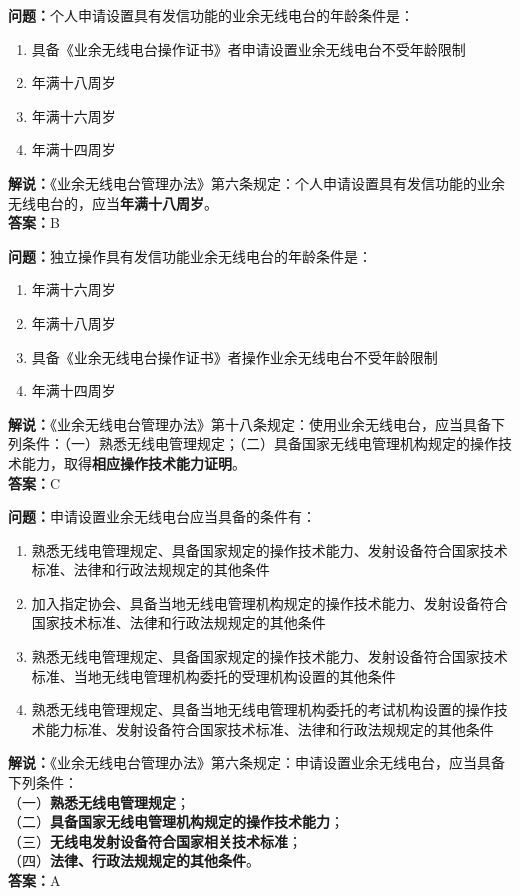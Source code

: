 \bigskip


\noindent\textbf{问题：}个人申请设置具有发信功能的业余无线电台的年龄条件是：
\begin{enumerate}[label=\Alph*), leftmargin=3em]
	\item 具备《业余无线电台操作证书》者申请设置业余无线电台不受年龄限制
	\item 年满十八周岁
	\item 年满十六周岁
	\item 年满十四周岁
\end{enumerate}
\noindent\textbf{解说：}《业余无线电台管理办法》第六条规定：个人申请设置具有发信功能的业余无线电台的，应当\textbf{年满十八周岁}。\\\noindent\textbf{答案：}B


\bigskip


\noindent\textbf{问题：}独立操作具有发信功能业余无线电台的年龄条件是：
\begin{enumerate}[label=\Alph*), leftmargin=3em]
	\item 年满十六周岁
	\item 年满十八周岁
	\item 具备《业余无线电台操作证书》者操作业余无线电台不受年龄限制
	\item 年满十四周岁
\end{enumerate}
\noindent\textbf{解说：}《业余无线电台管理办法》第十八条规定：使用业余无线电台，应当具备下列条件：（一）熟悉无线电管理规定；（二）具备国家无线电管理机构规定的操作技术能力，取得\textbf{相应操作技术能力证明}。\\\noindent\textbf{答案：}C


\bigskip


\noindent\textbf{问题：}申请设置业余无线电台应当具备的条件有：
\begin{enumerate}[label=\Alph*), leftmargin=3em]
	\item 熟悉无线电管理规定、具备国家规定的操作技术能力、发射设备符合国家技术标准、法律和行政法规规定的其他条件
	\item 加入指定协会、具备当地无线电管理机构规定的操作技术能力、发射设备符合国家技术标准、法律和行政法规规定的其他条件
	\item 熟悉无线电管理规定、具备国家规定的操作技术能力、发射设备符合国家技术标准、当地无线电管理机构委托的受理机构设置的其他条件
	\item 熟悉无线电管理规定、具备当地无线电管理机构委托的考试机构设置的操作技术能力标准、发射设备符合国家技术标准、法律和行政法规规定的其他条件
\end{enumerate}
\noindent\textbf{解说：}《业余无线电台管理办法》第六条规定：申请设置业余无线电台，应当具备下列条件：\\
（一）\textbf{熟悉无线电管理规定}；\\
（二）\textbf{具备国家无线电管理机构规定的操作技术能力}；\\
（三）\textbf{无线电发射设备符合国家相关技术标准}；\\
（四）\textbf{法律、行政法规规定的其他条件}。\\\noindent\textbf{答案：}A


